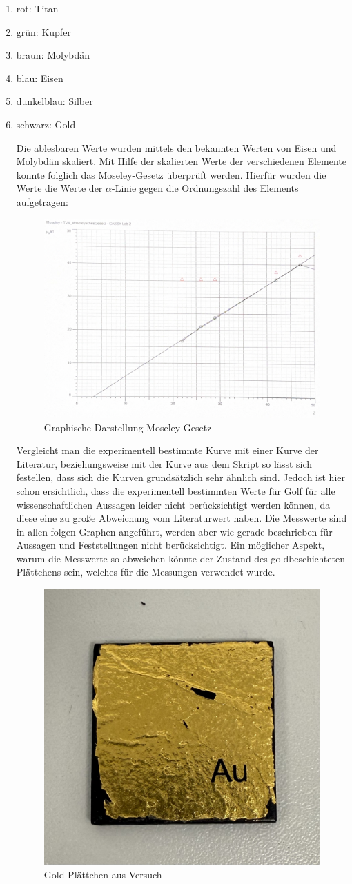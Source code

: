 \documentclass{article}
\begin{document}
\begin{enumerate}
    \item rot: Titan
    \item grün: Kupfer
    \item braun: Molybdän
    \item blau: Eisen
    \item dunkelblau: Silber
    \item schwarz: Gold

Die ablesbaren Werte wurden mittels den bekannten Werten von Eisen und Molybdän skaliert. Mit Hilfe der skalierten Werte der verschiedenen Elemente konnte folglich das Moseley-Gesetz überprüft werden. Hierfür wurden die Werte die Werte der $\alpha$-Linie gegen die Ordnungszahl des Elements aufgetragen:

\begin{figure}[H]
    \centering
    \includegraphics[width=0.7\linewidth]{Abbildungen/Moseley.png}
    \caption{Graphische Darstellung Moseley-Gesetz}
\end{figure}

Vergleicht man die experimentell bestimmte Kurve mit einer Kurve der Literatur, beziehungsweise mit der Kurve aus dem Skript so lässt sich festellen, dass sich die Kurven grundsätzlich sehr ähnlich sind. Jedoch ist hier schon ersichtlich, dass die experimentell bestimmten Werte für Golf für alle wissenschaftlichen Aussagen leider nicht berücksichtigt werden können, da diese eine zu große Abweichung vom Literaturwert haben. Die Messwerte sind in allen folgen Graphen angeführt, werden aber wie gerade beschrieben für Aussagen und Feststellungen nicht berücksichtigt. Ein möglicher Aspekt, warum die Messwerte so abweichen könnte der Zustand des goldbeschichteten Plättchens sein, welches für die Messungen verwendet wurde. 

\begin{figure}[H]
    \centering
    \includegraphics[width=0.4\linewidth]{Abbildungen/Gold.jpeg}
    \caption{Gold-Plättchen aus Versuch}
\end{figure}


\end{enumerate}
\end{document}
